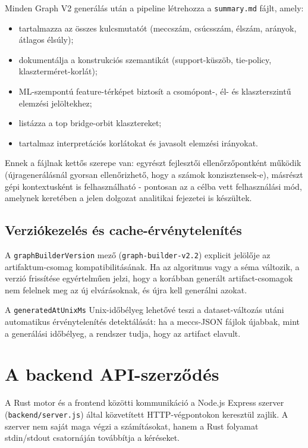 ﻿\documentclass[a4paper,12pt]{report}
\begin{document}
Minden Graph V2 generálás után a pipeline létrehozza a \texttt{summary.md} fájlt, amely:

\begin{itemize}
    \item tartalmazza az összes kulcsmutatót (meccszám, csúcsszám, élszám, arányok, átlagos élsúly);
    \item dokumentálja a konstrukciós szemantikát (support-küszöb, tie-policy, klaszterméret-korlát);
    \item ML-szempontú feature-térképet biztosít a csomópont-, él- és klaszterszintű elemzési jelöltekhez;
    \item listázza a top bridge-orbit klasztereket;
    \item tartalmaz interpretációs korlátokat és javasolt elemzési irányokat.
\end{itemize}

Ennek a fájlnak kettős szerepe van: egyrészt fejlesztői ellenőrzőpontként működik (újragenerálásnál gyorsan ellenőrizhető, hogy a számok konzisztensek-e), másrészt gépi kontextusként is felhasználható - pontosan az a célba vett felhasználási mód, amelynek keretében a jelen dolgozat analitikai fejezetei is készültek.

\subsection{Verziókezelés és cache-érvénytelenítés}

A \texttt{graphBuilderVersion} mező (\texttt{graph-builder-v2.2}) explicit jelölője az artifaktum-csomag kompatibilitásának. Ha az algoritmus vagy a séma változik, a verzió frissítése egyértelműen jelzi, hogy a korábban generált artifact-csomagok nem felelnek meg az új elvárásoknak, és újra kell generálni azokat.

A \texttt{generatedAtUnixMs} Unix-időbélyeg lehetővé teszi a dataset-változás utáni automatikus érvénytelenítés detektálását: ha a meccs-JSON fájlok újabbak, mint a generálási időbélyeg, a rendszer tudja, hogy az artifact elavult.

\section{A backend API-szerződés}

A Rust motor és a frontend közötti kommunikáció a Node.js Express szerver (\texttt{backend/server.js}) által közvetített HTTP-végpontokon keresztül zajlik. A szerver nem saját maga végzi a számításokat, hanem a Rust folyamat stdin/stdout csatornáján továbbítja a kéréseket.
\end{document}
